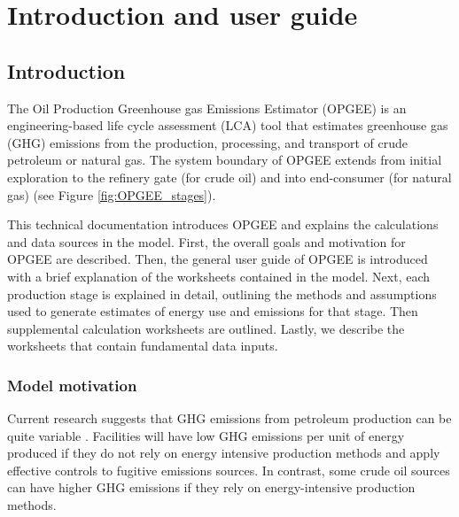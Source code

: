 \documentclass[11pt]{report}
\begin{document}

\part{Introduction and user guide}





\chapter{Introduction}

The Oil Production Greenhouse gas Emissions Estimator (OPGEE) is an engineering-based life cycle assessment (LCA) tool that estimates greenhouse gas (GHG) emissions from the production, processing, and transport of crude petroleum or natural gas. The system boundary of OPGEE extends from initial exploration to the refinery gate (for crude oil) and into end-consumer (for natural gas) (see Figure \ref{fig:OPGEE_stages}).

This technical documentation introduces OPGEE and explains the calculations and data sources in the model. First, the overall goals and motivation for OPGEE are described. Then, the general user guide of OPGEE is introduced with a brief explanation of the worksheets contained in the model. Next, each production stage is explained in detail, outlining the methods and assumptions used to generate estimates of energy use and emissions for that stage. Then supplemental calculation worksheets are outlined. Lastly, we describe the worksheets that contain fundamental data inputs.


\clearpage

\section{Model motivation}

Current research suggests that GHG emissions from petroleum production can be quite variable \cite{Keesom2009, Rosenfeld2009, Howarth2010, Skone2008, Gerdes2009, Brandt2011b, Charpentier2009a, Charpentier2011}. Facilities will have low GHG emissions per unit of energy produced if they do not rely on energy intensive production methods and apply effective controls to fugitive emissions sources. In contrast, some crude oil sources can have higher GHG emissions if they rely on energy-intensive production methods. 
\end{document}
